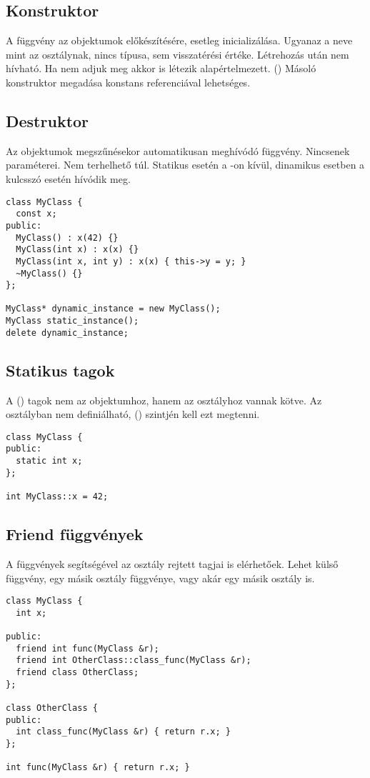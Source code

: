\documentclass[../../main.tex]{subfiles}
\begin{document}
\subsection{Konstruktor}

A  függvény az objektumok előkészítésére, esetleg
inicializálása. Ugyanaz a neve mint az osztálynak, nincs típusa, sem
visszatérési értéke. Létrehozás után nem hívható. Ha nem adjuk meg akkor
is létezik alapértelmezett. () Másoló konstruktor megadása
konstans referenciával lehetséges.

\subsection{Destruktor}

Az objektumok megszűnésekor automatikusan meghívódó függvény.
Nincsenek paraméterei. Nem terhelhető túl. Statikus  esetén a
-on kívül, dinamikus esetben a  kulcsszó esetén
hívódik meg.

\begin{verbatim}
class MyClass {
  const x;
public:
  MyClass() : x(42) {}
  MyClass(int x) : x(x) {}
  MyClass(int x, int y) : x(x) { this->y = y; }
  ~MyClass() {}
};

MyClass* dynamic_instance = new MyClass();
MyClass static_instance();
delete dynamic_instance;
\end{verbatim}

\subsection{Statikus tagok}

A  () tagok nem az objektumhoz, hanem az osztályhoz
vannak kötve. Az osztályban nem definiálható,  ()
szintjén kell ezt megtenni.

\begin{verbatim}
class MyClass {
public:
  static int x;
};

int MyClass::x = 42;
\end{verbatim}

\subsection{Friend függvények}

A  függvények segítségével az osztály rejtett tagjai is elérhetőek.
Lehet külső függvény, egy másik osztály függvénye, vagy akár egy másik osztály
is.

\begin{verbatim}
class MyClass {
  int x;

public:
  friend int func(MyClass &r);
  friend int OtherClass::class_func(MyClass &r);
  friend class OtherClass;
};

class OtherClass {
public:
  int class_func(MyClass &r) { return r.x; }
};

int func(MyClass &r) { return r.x; }
\end{verbatim}
\end{document}
